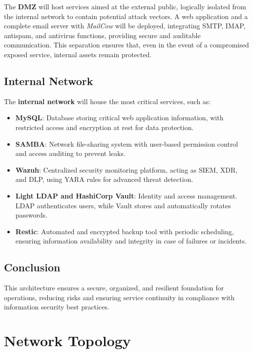 \documentclass[12pt]{report}
\begin{document}
The \textbf{DMZ} will host services aimed at the external public, logically isolated from the internal network to contain potential attack vectors. A web application and a complete email server with \textit{MailCow} will be deployed, integrating SMTP, IMAP, antispam, and antivirus functions, providing secure and auditable communication. This separation ensures that, even in the event of a compromised exposed service, internal assets remain protected.

\subsection*{Internal Network}

The \textbf{internal network} will house the most critical services, such as:

\begin{itemize}
    \item \textbf{MySQL}: Database storing critical web application information, with restricted access and encryption at rest for data protection.
    \item \textbf{SAMBA}: Network file-sharing system with user-based permission control and access auditing to prevent leaks.
    \item \textbf{Wazuh}: Centralized security monitoring platform, acting as SIEM, XDR, and DLP, using YARA rules for advanced threat detection.
    \item \textbf{Light LDAP and HashiCorp Vault}: Identity and access management. LDAP authenticates users, while Vault stores and automatically rotates passwords.
    \item \textbf{Restic}: Automated and encrypted backup tool with periodic scheduling, ensuring information availability and integrity in case of failures or incidents.
\end{itemize}

\subsection*{Conclusion}

This architecture ensures a secure, organized, and resilient foundation for operations, reducing risks and ensuring service continuity in compliance with information security best practices.

\newpage
\section*{Network Topology}
\end{document}
